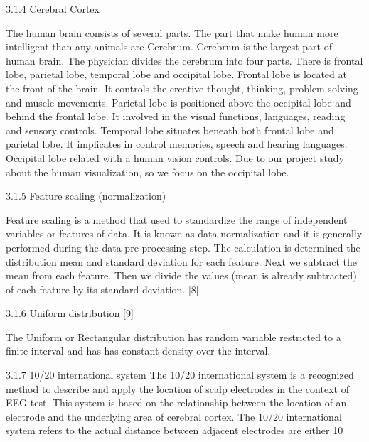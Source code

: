3.1.4 Cerebral Cortex

The human brain consists of several parts. The part that make human more intelligent than any animals are Cerebrum. Cerebrum is the largest part of human brain. The physician divides the cerebrum into four parts. There is frontal lobe, parietal lobe, temporal lobe and occipital lobe. Frontal lobe is located at the front of the brain. It controls the creative thought, thinking, problem solving and muscle movements. Parietal lobe is positioned above the occipital lobe and behind the frontal lobe. It involved in the visual functions, languages, reading and sensory controls. Temporal lobe situates beneath both frontal lobe and parietal lobe. It implicates in control memories, speech and hearing languages. Occipital lobe related with a human vision controls. Due to our project study about the human visualization, so we focus on the occipital lobe.

3.1.5 Feature scaling (normalization)

Feature scaling is a method that used to standardize the range of independent variables or features of data. It is known as data normalization and it is generally performed during the data pre-processing step. The calculation is determined the distribution mean and standard deviation for each feature. Next we subtract the mean from each feature. Then we divide the values (mean is already subtracted) of each feature by its standard deviation. [8]  

3.1.6 Uniform distribution [9]

The Uniform or Rectangular distribution has random variable  restricted to a finite interval  and has  has constant density over the interval.

3.1.7 10/20 international system
The 10/20 international system is a recognized method to describe and apply the location of scalp electrodes in the context of EEG test. This system is based on the relationship between the location of an electrode and the underlying area of cerebral cortex. The 10/20 international system refers to the actual distance between adjacent electrodes are either 10%

